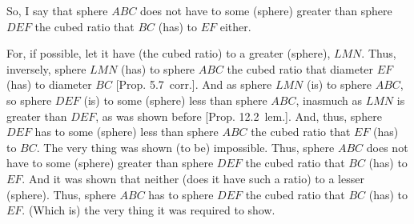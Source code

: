 \begin{Parallel}{}{}
{So, I say that sphere $ABC$ does not have to some (sphere) greater than sphere $DEF$ the cubed ratio that
$BC$ (has) to $EF$ either.

For, if possible, let it have (the cubed ratio) to a greater (sphere), $LMN$. Thus, inversely, sphere $LMN$
(has) to sphere $ABC$ the cubed ratio that diameter $EF$ (has) to diameter $BC$ [Prop. 5.7~corr.].
And as sphere $LMN$ (is) to sphere $ABC$, so sphere $DEF$ (is) to some (sphere) less than sphere $ABC$, inasmuch
as  $LMN$ is greater than $DEF$, as was shown before [Prop. 12.2~lem.]. And, thus, sphere
$DEF$ has to some (sphere) less than sphere $ABC$ the cubed ratio that $EF$ (has) to $BC$. The very thing
was shown (to be) impossible. Thus, sphere $ABC$ does not have to some (sphere) greater than sphere $DEF$
the cubed ratio that $BC$ (has) to $EF$. And it was shown that neither (does it have such a ratio) to a lesser
(sphere). Thus, sphere $ABC$ has to sphere $DEF$ the cubed ratio that $BC$ (has) to $EF$. (Which is)
the very thing it was required to show.}
\end{Parallel}